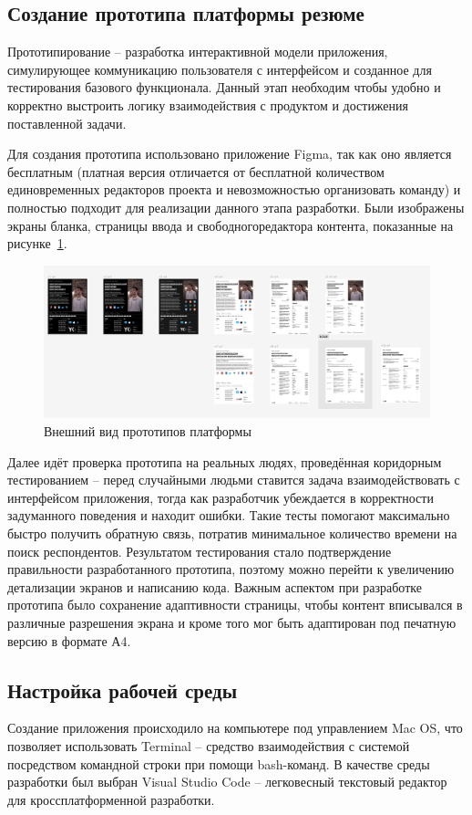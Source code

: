 \documentclass[master, och, diploma]{SCWorks}
\begin{document}
\subsection{Создание прототипа платформы резюме}
Прототипирование – разработка интерактивной модели приложения, симулирующее коммуникацию пользователя с интерфейсом и созданное для тестирования базового функционала. Данный этап необходим чтобы удобно и корректно выстроить логику взаимодействия с продуктом и достижения поставленной задачи.

Для создания прототипа использовано приложение Figma, так как оно является бесплатным (платная версия отличается от бесплатной количеством единовременных редакторов проекта и невозможностью организовать команду) и полностью подходит для реализации данного этапа разработки. Были изображены экраны бланка, страницы ввода и свободногоредактора контента, показанные на рисунке~\ref{fig:20}.

\begin{figure}[!ht]
    \centering
    \includegraphics[width=12cm]{images/image21.png}
    \caption{\label{fig:20}%
        Внешний вид прототипов платформы}
\end{figure}

Далее идёт проверка прототипа на реальных людях, проведённая коридорным тестированием – перед случайными людьми ставится задача взаимодействовать с интерфейсом приложения, тогда как разработчик убеждается в корректности задуманного поведения и находит ошибки. Такие тесты помогают максимально быстро получить обратную связь, потратив минимальное количество времени на поиск респондентов. Результатом тестирования стало подтверждение правильности разработанного прототипа, поэтому можно перейти к увеличению детализации экранов и написанию кода. Важным аспектом при разработке прототипа было сохранение адаптивности страницы, чтобы контент вписывался в различные разрешения экрана и кроме того мог быть адаптирован под печатную версию в формате А4.



\subsection{Настройка рабочей среды}
Создание приложения происходило на компьютере под управлением Mac OS, что позволяет использовать Terminal – средство взаимодействия с системой посредством командной строки при помощи bash-команд. В качестве среды разработки был выбран Visual Studio Code – легковесный текстовый редактор для кроссплатформенной разработки.
\end{document}
